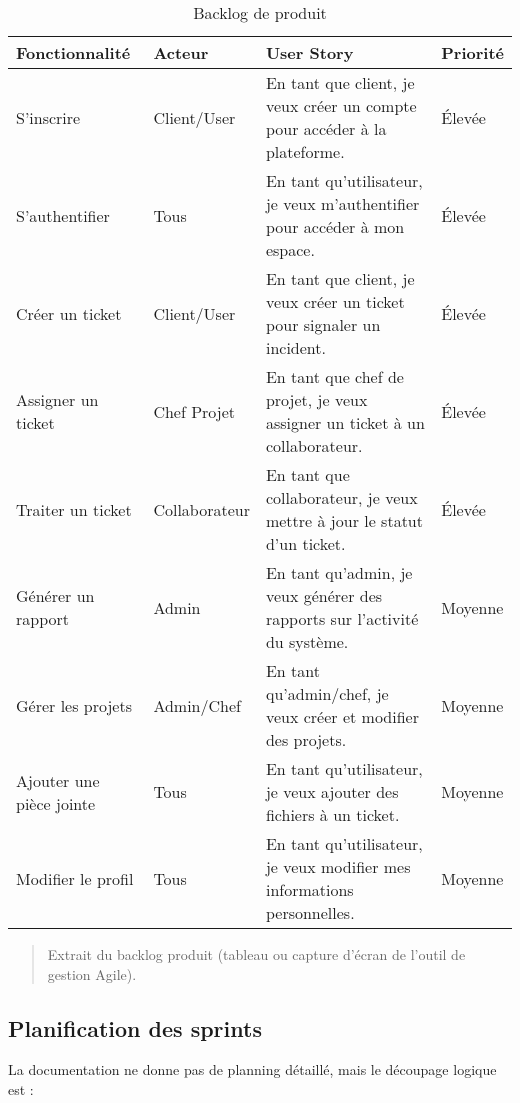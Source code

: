 \renewcommand{\arraystretch}{1.2}
\begin{table}[htbp]
    \centering
    \setlength{\tabcolsep}{6pt}
    \begin{tabular}{|p{2.5cm}|p{2cm}|p{8cm}|p{1.5cm}|}
        \hline
        \textbf{Fonctionnalité} & \textbf{Acteur} & \textbf{User Story} & \textbf{Priorité} \\
        \hline
        S'inscrire & Client/User & En tant que client, je veux créer un compte pour accéder à la plateforme. & Élevée \\
        \hline
        S'authentifier & Tous & En tant qu'utilisateur, je veux m'authentifier pour accéder à mon espace. & Élevée \\
        \hline
        Créer un ticket & Client/User & En tant que client, je veux créer un ticket pour signaler un incident. & Élevée \\
        \hline
        Assigner un ticket & Chef Projet & En tant que chef de projet, je veux assigner un ticket à un collaborateur. & Élevée \\
        \hline
        Traiter un ticket & Collaborateur & En tant que collaborateur, je veux mettre à jour le statut d'un ticket. & Élevée \\
        \hline
        Générer un rapport & Admin & En tant qu'admin, je veux générer des rapports sur l'activité du système. & Moyenne \\
        \hline
        Gérer les projets & Admin/Chef & En tant qu'admin/chef, je veux créer et modifier des projets. & Moyenne \\
        \hline
        Ajouter une pièce jointe & Tous & En tant qu'utilisateur, je veux ajouter des fichiers à un ticket. & Moyenne \\
        \hline
        Modifier le profil & Tous & En tant qu'utilisateur, je veux modifier mes informations personnelles. & Moyenne \\
        \hline
    \end{tabular}
    \caption{Backlog de produit}
    \label{tab:backlog-produit}
\end{table}
\renewcommand{\arraystretch}{1}

\begin{quote}
    Extrait du backlog produit (tableau ou capture d'écran de l'outil de gestion Agile).
\end{quote}

\subsection{Planification des sprints}
\label{sec:planification-des-sprints}
La documentation ne donne pas de planning détaillé, mais le découpage logique est :

